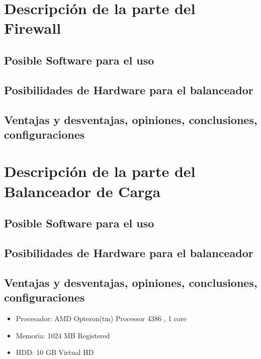\section{Descripción de la parte del Firewall}

\subsection{Posible Software para el uso}

\subsection{Posibilidades de Hardware para el balanceador}

\subsection{Ventajas y desventajas, opiniones, conclusiones, configuraciones}

%

\section{Descripción de la parte del Balanceador de Carga}

\subsection{Posible Software para el uso}

\subsection{Posibilidades de Hardware para el balanceador}

\subsection{Ventajas y desventajas, opiniones, conclusiones, configuraciones}
\begin{itemize}
	\item Procesador: AMD Opteron(tm) Processor 4386 , 1 core
	\item Memoria: 1024 MB Registered
	\item HDD: 10 GB Virtual HD
\end{itemize}

